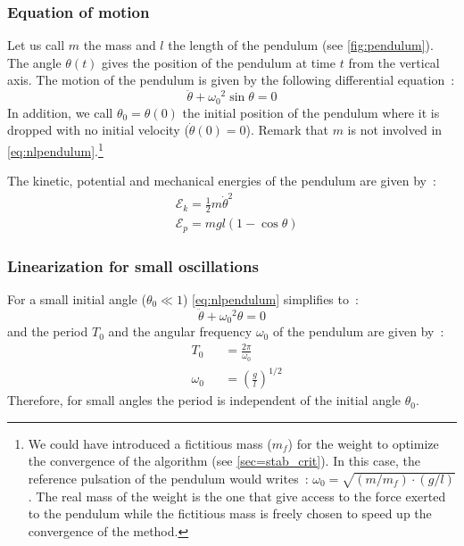 \subsubsection{Equation of motion}
Let us call $m$ the mass and $l$ the length of the pendulum (see \cref{fig:pendulum}). The angle $\theta(t)$ gives the position of the pendulum at time $t$ from the vertical axis. The motion of the pendulum is given by the following differential equation~:
\begin{equation}
	\ddot{\theta} + {\omega_0}^2 \sin{\theta} = 0 \label{eq:nlpendulum}
\end{equation}
In addition, we call $\theta_0 = \theta(0)$ the initial position of the pendulum where it is dropped with no initial velocity ($\dot{\theta}(0) = 0$). Remark that $m$ is not involved in \cref{eq:nlpendulum}.\footnote{We could have introduced a fictitious mass ($m_f$) for the weight to optimize the convergence of the algorithm (see \cref{sec=stab_crit}). In this case, the reference pulsation of the pendulum would writes~: $\omega_0 = \sqrt{(m/m_f)\cdot(g/l)}$. The real mass of the weight is the one that give access to the force exerted to the pendulum while the fictitious mass is freely chosen to speed up the convergence of the method.}

The kinetic, potential and mechanical energies of the pendulum are given by~:
\begin{subequations}
\begin{alignat}{5}	
	&\mathcal{E}_k = \frac{1}{2} m \dot{\theta}^2 
	\\
	&\mathcal{E}_p =  mgl (1-\cos\theta) 
\end{alignat}
\end{subequations}
\subsubsection{Linearization for small oscillations}
For a small initial angle ($\theta_0 \ll 1$) \cref{eq:nlpendulum} simplifies to~:
\begin{equation}
	\ddot{\theta} + {\omega_0}^2 {\theta} = 0 \label{eq:lpendulum}
\end{equation}
and the period $T_0$ and the angular frequency $\omega_0$ of the pendulum are given by~:
\begin{subequations}
\begin{alignat}{5}	
	&{T_0} &&= \frac{2\pi}{\omega_0}\\[0.5em]
	&{\omega_0} &&= \left({\frac{g}{l}}\right)^{1/2}
\end{alignat}
\end{subequations}
Therefore, for small angles the period is independent of the initial angle $\theta_0$.

